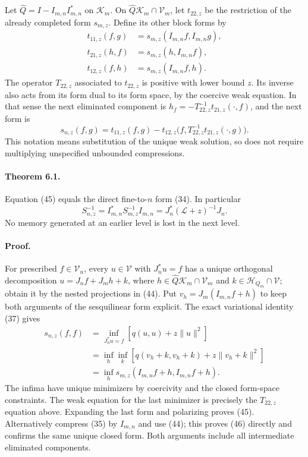 \documentclass[11pt]{article}
\newcommand{\HH}{\mathscr H}
\newcommand{\KK}{\mathscr K}
\newcommand{\LL}{\mathscr L}
\newcommand{\VV}{\mathscr V}
\begin{document}
Let $\widehat Q=I-I_{m,n}I_{m,n}^*$ on $\KK_m$. On
$\widehat Q\KK_m\cap\VV_m$, let $t_{22,z}$ be the restriction of the
already completed form $s_{m,z}$. Define its other block forms by
\begin{align*}
 t_{11,z}(f,g)&=s_{m,z}(I_{m,n}f,I_{m,n}g),\\
 t_{21,z}(h,f)&=s_{m,z}(h,I_{m,n}f),\\
 t_{12,z}(f,h)&=s_{m,z}(I_{m,n}f,h).
\end{align*}
The operator $T_{22,z}$ associated to $t_{22,z}$ is positive with lower
bound $z$. Its inverse also acts from its form dual to its form space,
by the coercive weak equation. In that sense the next eliminated component
is $h_f=-T_{22,z}^{-1}t_{21,z}(\cdot,f)$, and the next form is
\begin{equation}\label{eq:recursive}
 s_{n,z}(f,g)=t_{11,z}(f,g)
       -t_{12,z}\bigl(f,T_{22,z}^{-1}t_{21,z}(\cdot,g)\bigr).
\end{equation}
This notation means substitution of the unique weak solution, so does
not require multiplying unspecified unbounded compressions.

\paragraph{Theorem 6.1.}
Equation (45) equals the direct fine-to-$n$ form
(34). In particular
\begin{equation}\label{eq:resolventtower}
 S_{n,z}^{-1}=I_{m,n}^*S_{m,z}^{-1}I_{m,n}
            =J_n^*(\LL+z)^{-1}J_n.
\end{equation}
No memory generated at an earlier level is lost in the next level.

\paragraph{Proof.}
For prescribed $f\in\VV_n$, every $u\in\VV$ with $J_n^*u=f$ has a
unique orthogonal decomposition
$u=J_n f+J_mh+k$, where $h\in\widehat Q\KK_m\cap\VV_m$ and
$k\in\HH_{Q_m}\cap\VV$; obtain it by the nested projections in
(44). Put $v_h=J_m(I_{m,n}f+h)$ to keep both arguments
of the sesquilinear form explicit. The exact variational identity
(37) gives
\begin{align*}
 s_{n,z}(f,f)
 &=\inf_{J_n^*u=f}[q(u,u)+z\|u\|^2]\\
 &=\inf_h\inf_k[q(v_h+k,v_h+k)+z\|v_h+k\|^2]\\
 &=\inf_h s_{m,z}(I_{m,n}f+h,I_{m,n}f+h).
\end{align*}
The infima have unique minimizers by coercivity and the closed form-space
constraints. The weak equation for the last minimizer is precisely the
$T_{22,z}$ equation above. Expanding the last form and polarizing proves
(45). Alternatively compress
(35) by $I_{m,n}$ and use (44); this proves
(46) directly and confirms the same unique closed
form. Both arguments include all intermediate eliminated components.
\end{document}

